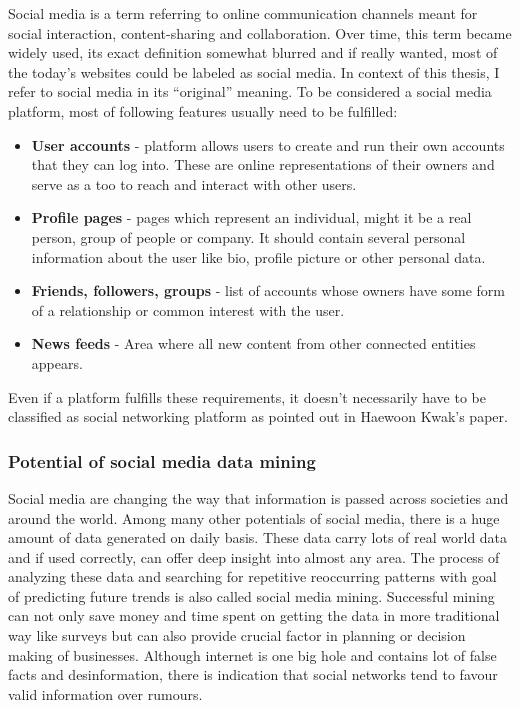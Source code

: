 Social media is a term referring to online communication channels meant for social interaction, content-sharing and collaboration. Over time, this term became widely used, its exact definition somewhat blurred and if really wanted, most of the today's websites could be labeled as social media. In context of this thesis,  I refer to social media in its “original” meaning. To be considered a social media platform, most of following features usually need to be fulfilled:

\begin{itemize}
  \item \textbf{User accounts} - platform allows users to create and run their own accounts that they can log into. These are online representations of their owners and serve as a too to reach and interact with other users.
  \item \textbf{Profile pages} - pages which represent an individual, might it be a real person, group of people or company. It should contain several personal information about the user like bio, profile picture or other personal data.
  \item \textbf{Friends, followers, groups} - list of accounts whose owners have some form of a relationship  or common interest with the user.
  \item \textbf{News feeds} - Area where all new content from other connected entities appears.
\end{itemize}

Even if a platform fulfills these requirements, it doesn't necessarily have to be classified as social networking platform as pointed out in Haewoon Kwak's paper\cite{kwak2010twitter}.

\subsubsection{Potential of social media data mining}
Social media are changing the way that information is passed across societies and around the world.\cite{mayfield2008social}
Among many other potentials of social media, there is a huge amount of data generated on daily basis. These data carry lots of real world data and if used correctly, can offer deep insight into almost any area. The process of analyzing these data and searching for repetitive reoccurring patterns with goal of predicting future trends is also called social media mining. Successful mining can not only save money and time spent on getting the data in more traditional way like surveys but can also provide crucial factor in planning or decision making of businesses. Although internet is one big hole and contains lot of false facts and desinformation, there is indication that social networks tend to favour
valid information over rumours.\cite{castillo2011information} 


